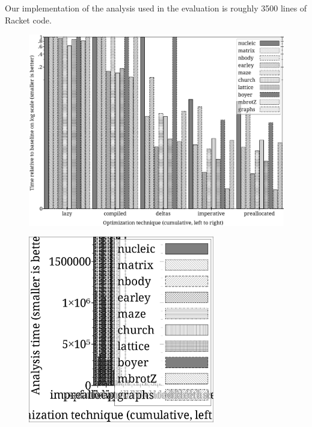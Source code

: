 \documentclass[preprint,onecolumn,9pt]{sigplanconf} %
\begin{document}
Our implementation of the analysis used in the evaluation is roughly
3500 lines of Racket code.

\begin{figure}
\begin{center}
\includegraphics[width=6in]{rel-time.ps}
\end{center}
\end{figure}

\begin{figure}
\begin{center}
\includegraphics[width=3.2in]{abs-time.ps}
\end{center}
\end{figure}
\end{document}
